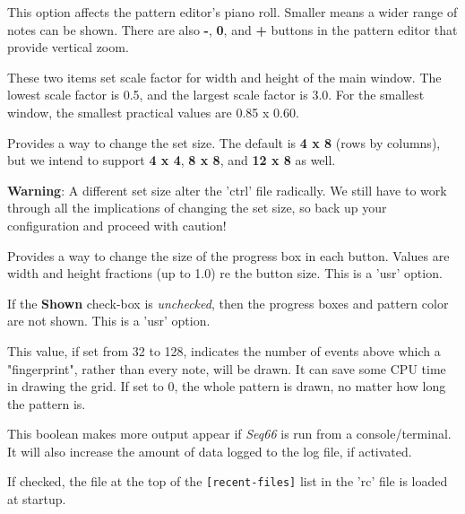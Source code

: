    \setcounter{ItemCounter}{0}      %

   This option affects the pattern editor's piano roll.  Smaller means a wider
   range of notes can be shown.  There are also
   \textbf{-},
   \textbf{0}, and
   \textbf{+} buttons in the pattern editor that provide
   vertical zoom.

   These two items set scale factor for width and height of the main window.
   The lowest scale factor is 0.5, and the largest scale factor is 3.0.
   For the smallest window, the smallest practical values are 0.85 x 0.60.

   Provides a way to change the set size.  The default is
   \textbf{4 x 8}
   (rows by columns), but we intend to support
   \textbf{4 x 4},
   \textbf{8 x 8}, and
   \textbf{12 x 8}
   as well.

   \textbf{Warning}:
   A different set size alter the 'ctrl' file radically.
   We still have to work through all the implications of changing the set size,
   so back up your configuration and proceed with caution!

   Provides a way to change the size of the progress box in each button.
   Values are width and height fractions (up to 1.0) re the button size.
   This is a 'usr' option.

   If the \textbf{Shown} check-box
   is \textsl{unchecked}, then the progress boxes and pattern color are not
   shown.
   This is a 'usr' option.

   This value, if set from 32 to 128, indicates the number of events above
   which a "fingerprint", rather than every note, will be drawn.  It can
   save some CPU time in drawing the grid.  If set to 0, the whole
   pattern is drawn, no matter how long the pattern is.

   This boolean makes more output appear if \textsl{Seq66} is run from a
   console/terminal. It will also increase the amount of data logged to the log
   file, if activated.

   If checked, the file at the top of the \texttt{[recent-files]}
   list in the 'rc' file is loaded at startup.

